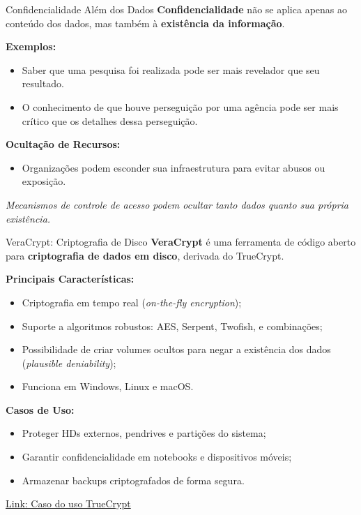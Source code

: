 \begin{frame}{Confidencialidade Além dos Dados}
  \textbf{Confidencialidade} não se aplica apenas ao conteúdo dos dados, mas também à \textbf{existência da informação}.

  \vspace{0.3cm}
  \textbf{Exemplos:}
  \begin{itemize}
    \item Saber que uma pesquisa foi realizada pode ser mais revelador que seu resultado.
    \item O conhecimento de que houve perseguição por uma agência pode ser mais crítico que os detalhes dessa perseguição.
  \end{itemize}

  \vspace{0.3cm}
  \textbf{Ocultação de Recursos:}
  \begin{itemize}
    \item Organizações podem esconder sua infraestrutura para evitar abusos ou exposição.

  \end{itemize}

  \vspace{0.3cm}
  \textit{Mecanismos de controle de acesso podem ocultar tanto dados quanto sua própria existência.}
\end{frame}

\begin{frame}{VeraCrypt: Criptografia de Disco}
  \textbf{VeraCrypt} é uma ferramenta de código aberto para \textbf{criptografia de dados em disco}, derivada do TrueCrypt.

  \vspace{0.3cm}
  \textbf{Principais Características:}
  \begin{itemize}
    \item Criptografia em tempo real (\textit{on-the-fly encryption});
    \item Suporte a algoritmos robustos: AES, Serpent, Twofish, e combinações;
    \item Possibilidade de criar volumes ocultos para negar a existência dos dados (\textit{plausible deniability});
    \item Funciona em Windows, Linux e macOS.
  \end{itemize}

  \vspace{0.3cm}
  \textbf{Casos de Uso:}
  \begin{itemize}
    \item Proteger HDs externos, pendrives e partições do sistema;
    \item Garantir confidencialidade em notebooks e dispositivos móveis;
    \item Armazenar backups criptografados de forma segura.
  \end{itemize}

  \href{https://g1.globo.com/politica/noticia/2010/06/nem-fbi-consegue-decifrar-arquivos-de-daniel-dantas-diz-jornal.html}{Link: Caso do uso TrueCrypt}
\end{frame}



